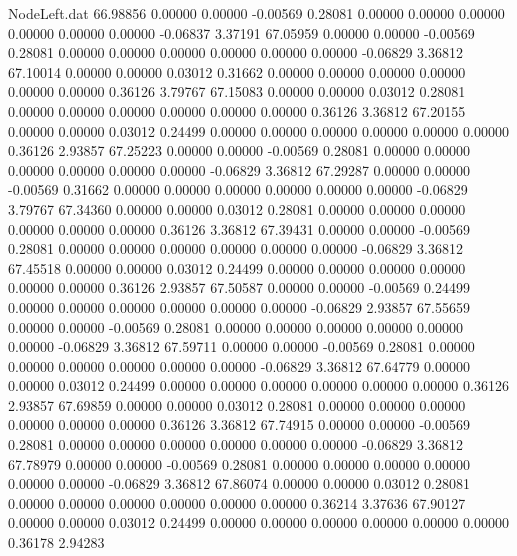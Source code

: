 \begin{filecontents}{NodeLeft.dat}
  66.98856    0.00000    0.00000    -0.00569    0.28081    0.00000    0.00000    0.00000    0.00000    0.00000    0.00000   -0.06837    3.37191
  67.05959    0.00000    0.00000    -0.00569    0.28081    0.00000    0.00000    0.00000    0.00000    0.00000    0.00000   -0.06829    3.36812
  67.10014    0.00000    0.00000     0.03012    0.31662    0.00000    0.00000    0.00000    0.00000    0.00000    0.00000    0.36126    3.79767
  67.15083    0.00000    0.00000     0.03012    0.28081    0.00000    0.00000    0.00000    0.00000    0.00000    0.00000    0.36126    3.36812
  67.20155    0.00000    0.00000     0.03012    0.24499    0.00000    0.00000    0.00000    0.00000    0.00000    0.00000    0.36126    2.93857
  67.25223    0.00000    0.00000    -0.00569    0.28081    0.00000    0.00000    0.00000    0.00000    0.00000    0.00000   -0.06829    3.36812
  67.29287    0.00000    0.00000    -0.00569    0.31662    0.00000    0.00000    0.00000    0.00000    0.00000    0.00000   -0.06829    3.79767
  67.34360    0.00000    0.00000     0.03012    0.28081    0.00000    0.00000    0.00000    0.00000    0.00000    0.00000    0.36126    3.36812
  67.39431    0.00000    0.00000    -0.00569    0.28081    0.00000    0.00000    0.00000    0.00000    0.00000    0.00000   -0.06829    3.36812
  67.45518    0.00000    0.00000     0.03012    0.24499    0.00000    0.00000    0.00000    0.00000    0.00000    0.00000    0.36126    2.93857
  67.50587    0.00000    0.00000    -0.00569    0.24499    0.00000    0.00000    0.00000    0.00000    0.00000    0.00000   -0.06829    2.93857
  67.55659    0.00000    0.00000    -0.00569    0.28081    0.00000    0.00000    0.00000    0.00000    0.00000    0.00000   -0.06829    3.36812
  67.59711    0.00000    0.00000    -0.00569    0.28081    0.00000    0.00000    0.00000    0.00000    0.00000    0.00000   -0.06829    3.36812
  67.64779    0.00000    0.00000     0.03012    0.24499    0.00000    0.00000    0.00000    0.00000    0.00000    0.00000    0.36126    2.93857
  67.69859    0.00000    0.00000     0.03012    0.28081    0.00000    0.00000    0.00000    0.00000    0.00000    0.00000    0.36126    3.36812
  67.74915    0.00000    0.00000    -0.00569    0.28081    0.00000    0.00000    0.00000    0.00000    0.00000    0.00000   -0.06829    3.36812
  67.78979    0.00000    0.00000    -0.00569    0.28081    0.00000    0.00000    0.00000    0.00000    0.00000    0.00000   -0.06829    3.36812
  67.86074    0.00000    0.00000     0.03012    0.28081    0.00000    0.00000    0.00000    0.00000    0.00000    0.00000    0.36214    3.37636
  67.90127    0.00000    0.00000     0.03012    0.24499    0.00000    0.00000    0.00000    0.00000    0.00000    0.00000    0.36178    2.94283

\end{filecontents}
